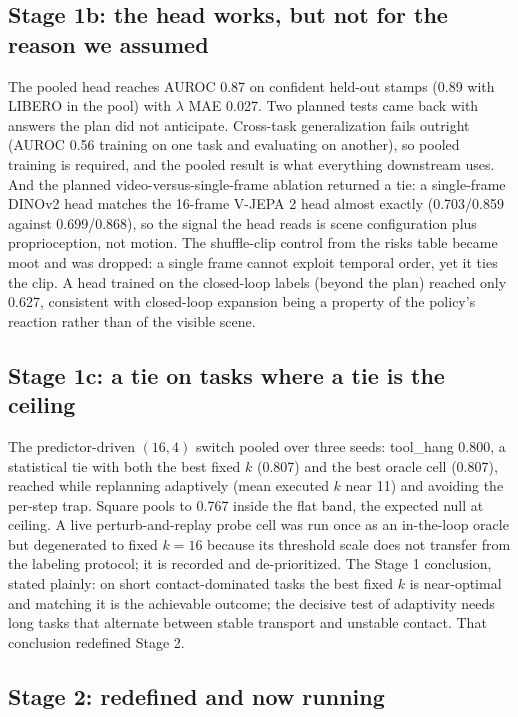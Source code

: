 \documentclass[11pt]{article}
\begin{document}
\subsection{Stage 1b: the head works, but not for the reason we assumed}

The pooled head reaches AUROC 0.87 on confident held-out stamps (0.89 with
LIBERO in the pool) with $\lambda$ MAE 0.027. Two planned tests came back with
answers the plan did not anticipate. Cross-task generalization fails outright
(AUROC 0.56 training on one task and evaluating on another), so pooled
training is required, and the pooled result is what everything downstream
uses. And the planned video-versus-single-frame ablation returned a tie: a
single-frame DINOv2 head matches the 16-frame V-JEPA 2 head almost exactly
(0.703/0.859 against 0.699/0.868), so the signal the head reads is scene
configuration plus proprioception, not motion. The shuffle-clip control from
the risks table became moot and was dropped: a single frame cannot exploit
temporal order, yet it ties the clip. A head trained on the closed-loop labels
(beyond the plan) reached only 0.627, consistent with closed-loop expansion
being a property of the policy's reaction rather than of the visible scene.

\subsection{Stage 1c: a tie on tasks where a tie is the ceiling}

The predictor-driven $(16, 4)$ switch pooled over three seeds: tool\_hang
0.800, a statistical tie with both the best fixed $k$ (0.807) and the best
oracle cell (0.807), reached while replanning adaptively (mean executed $k$
near 11) and avoiding the per-step trap. Square pools to 0.767 inside the flat
band, the expected null at ceiling. A live perturb-and-replay probe cell was
run once as an in-the-loop oracle but degenerated to fixed $k{=}16$ because
its threshold scale does not transfer from the labeling protocol; it is
recorded and de-prioritized. The Stage 1 conclusion, stated plainly: on short
contact-dominated tasks the best fixed $k$ is near-optimal and matching it is
the achievable outcome; the decisive test of adaptivity needs long tasks that
alternate between stable transport and unstable contact. That conclusion
redefined Stage 2.

\subsection{Stage 2: redefined and now running}
\end{document}
